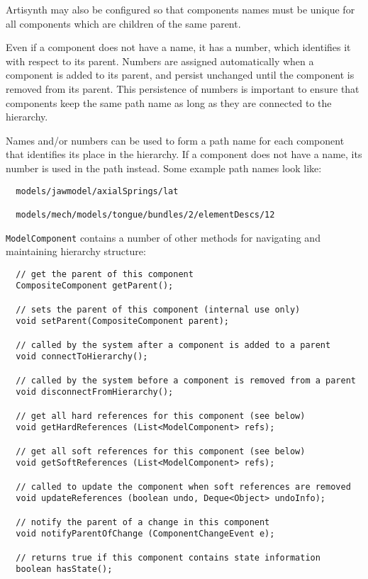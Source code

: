 \documentclass{article}
\begin{document}
Artisynth may also be configured so that components names must be
unique for all components which are children of the same parent.

Even if a component does not have a name, it has a number, which
identifies it with respect to its parent. Numbers are assigned
automatically when a component is added to its parent, and persist
unchanged until the component is removed from its parent.  This
persistence of numbers is important to ensure that components keep the
same path name as long as they are connected to the hierarchy.

Names and/or numbers can be used to form a path name for each
component that identifies its place in the hierarchy.  If a component
does not have a name, its number is used in the path instead. Some
example path names look like:

\begin{lstlisting}
  models/jawmodel/axialSprings/lat

  models/mech/models/tongue/bundles/2/elementDescs/12
\end{lstlisting}

{\tt ModelComponent} contains a number of other methods for navigating
and maintaining hierarchy structure:

\begin{lstlisting}
  // get the parent of this component
  CompositeComponent getParent();

  // sets the parent of this component (internal use only)
  void setParent(CompositeComponent parent);

  // called by the system after a component is added to a parent
  void connectToHierarchy();

  // called by the system before a component is removed from a parent
  void disconnectFromHierarchy();

  // get all hard references for this component (see below)
  void getHardReferences (List<ModelComponent> refs);

  // get all soft references for this component (see below)
  void getSoftReferences (List<ModelComponent> refs);

  // called to update the component when soft references are removed 
  void updateReferences (boolean undo, Deque<Object> undoInfo);

  // notify the parent of a change in this component
  void notifyParentOfChange (ComponentChangeEvent e);

  // returns true if this component contains state information
  boolean hasState();
\end{lstlisting}
\end{document}
